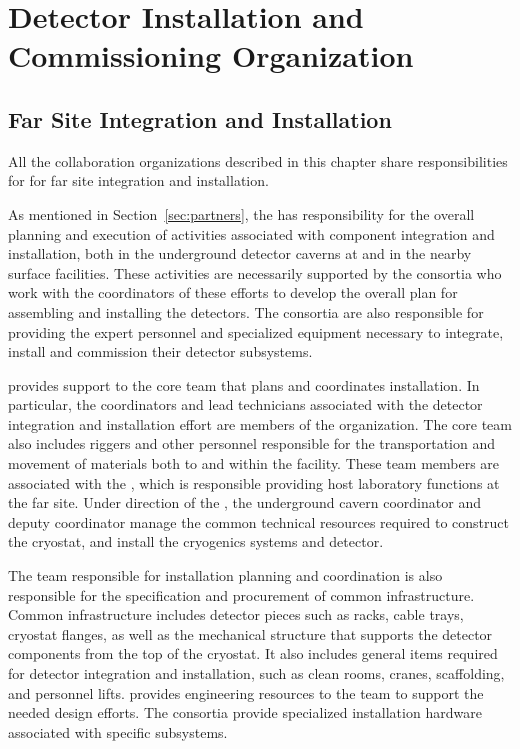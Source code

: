 \chapter{Detector Installation and Commissioning Organization}
\label{ch:tc-jpo}


\section{Far Site Integration and Installation}
\label{sec:far_site}

All the collaboration organizations described in this chapter share
responsibilities for for far site integration and installation.
 
As mentioned in Section~\ref{sec:partners}, the  
has responsibility for the overall planning and execution of
activities associated with component integration and installation,
both in the underground detector caverns at  and in the
nearby surface facilities.  These activities are necessarily supported
by the  consortia who work with the  coordinators of these
efforts to develop the overall plan for assembling and installing the
detectors.  The consortia are also responsible for providing the
expert personnel and specialized equipment necessary to integrate,
install and commission their detector subsystems.

  provides support to the  core team
that plans and coordinates installation.  In particular, the
coordinators and lead technicians associated with the detector
integration and installation effort are members of the 
organization.  The core team also includes riggers and other personnel
responsible for the transportation and movement of materials both to
and within the  facility.  These team members are
associated with the  , which is responsible
providing host laboratory functions at the far site. Under direction
of the , the underground cavern coordinator and deputy
coordinator manage the common technical resources required to
construct the cryostat, and install the cryogenics systems and
detector.


The  team responsible for installation planning and
coordination is also responsible for the specification and procurement
of common infrastructure.  Common infrastructure includes detector
pieces such as racks, cable trays, cryostat flanges, as well as the
mechanical structure that supports the detector components from the
top of the cryostat.  It also includes general items required for
detector integration and installation, such as clean rooms, cranes,
scaffolding, and personnel lifts.   provides
engineering resources to the  team to support the needed
design efforts. The consortia provide specialized installation
hardware associated with specific subsystems.


